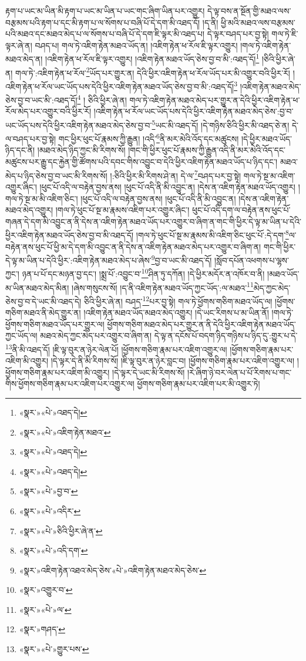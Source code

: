 རྟག་པ་ཡང་མ་ཡིན་མི་རྟག་པ་ཡང་མ་ཡིན་པ་ཡང་གང་ཞིག་ཡིན་པར་འགྱུར། དེ་ལྟ་བས་ན་སྔོན་གྱི་མཐའ་ལས་བརྩམས་པའི་རྟག་པ་དང་མི་རྟག་པ་ལ་སོགས་པ་བཞི་པོ་དེ་དག་མི་འཐད་དོ། །ད་ནི། ཕྱི་མའི་མཐའ་ལས་བརྩམས་པའི་མཐའ་དང་མཐའ་མེད་པ་ལ་སོགས་པ་བཞི་པོ་དེ་དག་ཇི་ལྟར་མི་འཐད་པ། དེ་ལྟར་བཤད་པར་བྱ་སྟེ། གལ་ཏེ་ཇི་ལྟར་ཞེ་ན། བཤད་པ། གལ་ཏེ་འཇིག་རྟེན་མཐའ་ཡོད་ན། །འཇིག་རྟེན་ཕ་རོལ་ཇི་ལྟར་འགྱུར། །གལ་ཏེ་འཇིག་རྟེན་མཐའ་མེད་ན། །འཇིག་རྟེན་ཕ་རོལ་ཇི་ལྟར་འགྱུར། །འཇིག་རྟེན་མཐའ་ཡོད་ཅེས་བྱ་བ་མི་:འཐད་དོ།\footnote{«སྣར་»«པེ་»འཐད་དེ།} །ཅིའི་ཕྱིར་ཞེ་ན། གལ་ཏེ་:འཇིག་རྟེན་ཕ་རོལ་\footnote{«སྣར་»«པེ་»འཇིག་རྟེན་མཐའ་}ཡོད་པར་གྱུར་ན། དེའི་ཕྱིར་འཇིག་རྟེན་ཕ་རོལ་ཡོད་པར་མི་འགྱུར་བའི་ཕྱིར་རོ། །འཇིག་རྟེན་ཕ་རོལ་ཡང་ཡོད་པས་དེའི་ཕྱིར་འཇིག་རྟེན་མཐའ་ཡོད་ཅེས་བྱ་བ་མི་:འཐད་དོ།\footnote{«སྣར་»«པེ་»འཐད་དེ།} །འཇིག་རྟེན་མཐའ་མེད་ཅེས་བྱ་བ་ཡང་མི་:འཐད་དོ།\footnote{«སྣར་»«པེ་»འཐད་དེ།} །
ཅིའི་ཕྱིར་ཞེ་ན། གལ་ཏེ་འཇིག་རྟེན་མཐའ་མེད་པར་གྱུར་ན་དེའི་ཕྱིར་འཇིག་རྟེན་ཕ་རོལ་མེད་པར་འགྱུར་བའི་ཕྱིར་རོ། །འཇིག་རྟེན་ཕ་རོལ་ཡང་ཡོད་པས་དེའི་ཕྱིར་འཇིག་རྟེན་མཐའ་མེད་ཅེས་:བྱ་བ་ཡང་ཡོད་པས་དེའི་ཕྱིར་འཇིག་རྟེན་མཐའ་མེད་ཅེས་བྱ་བ་\footnote{«སྣར་»«པེ་»བྱ་བ་}ཡང་མི་འཐད་དོ། །དེ་གཉིས་ཅིའི་ཕྱིར་མི་འཐད་ཅེ་ན། དེ་ལ་བཤད་པར་བྱ་སྟེ། གང་ཕྱིར་ཕུང་པོ་རྣམས་ཀྱི་རྒྱུན། །འདི་\footnote{«སྣར་»«པེ་»འདིར་}ནི་མར་མེའི་འོད་དང་མཚུངས། །དེ་ཕྱིར་མཐའ་ཡོད་ཉིད་དང་ནི། །མཐའ་མེད་ཉིད་ཀྱང་མི་རིགས་སོ། །གང་གི་ཕྱིར་ཕུང་པོ་རྣམས་ཀྱི་རྒྱུན་འདི་ནི་མར་མེའི་འོད་དང་མཚུངས་པར་རྒྱུ་དང་རྐྱེན་གྱི་ཚོགས་པའི་དབང་གིས་འབྱུང་བ་དེའི་ཕྱིར་འཇིག་རྟེན་མཐའ་ཡོད་པ་ཉིད་དང་། མཐའ་མེད་པ་ཉིད་ཅེས་བྱ་བ་ཡང་མི་རིགས་སོ། །:ཅིའི་ཕྱིར་མི་རིགས་ཤེ་ན། དེ་ལ་\footnote{«སྣར་»«པེ་»ཅིའི་ཕྱིར་ཞེ་ན་}བཤད་པར་བྱ་སྟེ། གལ་ཏེ་སྔ་མ་འཇིག་འགྱུར་ཞིང་། །ཕུང་པོ་འདི་ལ་བརྟེན་བྱས་ནས། །ཕུང་པོ་འདི་ནི་མི་འབྱུང་ན། །དེས་ན་འཇིག་རྟེན་མཐའ་ཡོད་འགྱུར། །གལ་ཏེ་སྔ་མ་མི་འཇིག་ཅིང་། །ཕུང་པོ་འདི་ལ་བརྟེན་བྱས་ནས། །ཕུང་པོ་འདི་ནི་མི་འབྱུང་ན། །དེས་ན་འཇིག་རྟེན་མཐའ་མེད་འགྱུར། །གལ་ཏེ་ཕུང་པོ་སྔ་མ་རྣམས་འཇིག་པར་འགྱུར་ཞིང་། ཕུང་པོ་འདི་དག་ལ་བརྟེན་ནས་ཕུང་པོ་གཞན་དེ་དག་མི་འབྱུང་ན་ནི་དེས་ན་འཇིག་རྟེན་མཐའ་ཡོད་པར་འགྱུར་བ་ཞིག་ན་གང་གི་ཕྱིར་དེ་ལྟ་མ་ཡིན་པ་དེའི་ཕྱིར་འཇིག་རྟེན་མཐའ་ཡོད་ཅེས་བྱ་བ་མི་འཐད་དོ། །གལ་ཏེ་ཕུང་པོ་སྔ་མ་རྣམས་མི་འཇིག་ཅིང་ཕུང་པོ་:དེ་དག་\footnote{«སྣར་»«པེ་»འདི་དག་}ལ་བརྟེན་ནས་ཕུང་པོ་ཕྱི་མ་དེ་དག་མི་འབྱུང་ན་ནི་དེས་ན་འཇིག་རྟེན་མཐའ་མེད་པར་འགྱུར་བ་ཞིག་ན། གང་གི་ཕྱིར་དེ་ལྟ་མ་ཡིན་པ་དེའི་ཕྱིར་:འཇིག་རྟེན་མཐའ་མེད་པ་ཞེས་\footnote{«སྣར་»འཇིག་རྟེན་འཐའ་མེད་ཅེས་«པེ་»འཇིག་རྟེན་མཐའ་མེད་ཅེས་}བྱ་བ་ཡང་མི་འཐད་དོ། །སློབ་དཔོན་འཕགས་པ་ལྷས་ཀྱང་། ཉན་པ་པོ་དང་མཉན་བྱ་དང་། །སྨྲ་པོ་:འབྱུང་བ་\footnote{«སྣར་»འགྱུར་བ་}ཤིན་ཏུ་དཀོན། །དེ་ཕྱིར་མདོར་ན་འཁོར་བ་ནི། །མཐའ་ཡོད་མ་ཡིན་མཐའ་མེད་མིན། །ཞེས་གསུངས་སོ། །ད་ནི་འཇིག་རྟེན་མཐའ་ཡོད་ཀྱང་ཡོད་:ལ་མཐའ་\footnote{«སྣར་»«པེ་»ལ་}མེད་ཀྱང་མེད་ཅེས་བྱ་བ་དེ་ཡང་མི་འཐད་དེ། ཅིའི་ཕྱིར་ཞེ་ན། བཤད་\footnote{«སྣར་»གཤད་}པར་བྱ་སྟེ། གལ་ཏེ་ཕྱོགས་གཅིག་མཐའ་ཡོད་ལ། །ཕྱོགས་གཅིག་མཐའ་ནི་མེད་གྱུར་ན། །འཇིག་རྟེན་མཐའ་ཡོད་མཐའ་མེད་འགྱུར། །དེ་ཡང་རིགས་པ་མ་ཡིན་ནོ། །གལ་ཏེ་ཕྱོགས་གཅིག་མཐའ་ཡོད་པར་གྱུར་ལ། ཕྱོགས་གཅིག་མཐའ་མེད་པར་གྱུར་ན་ནི་དེའི་ཕྱིར་འཇིག་རྟེན་མཐའ་ཡོད་ཀྱང་ཡོད་ལ། མཐའ་མེད་ཀྱང་མེད་པར་འགྱུར་བ་ཞིག་ན། དེ་ལྟ་ན་དངོས་པོ་བདག་ཉིད་གཉིས་པ་ཉིད་དུ་:གྱུར་པ་དེ་\footnote{«སྣར་»«པེ་»གྱུར་པས་}ནི་མི་འཐད་དོ། །ཇི་ལྟ་བུར་ན་ཉེར་ལེན་པོ། །ཕྱོགས་གཅིག་རྣམ་པར་འཇིག་འགྱུར་ལ། །ཕྱོགས་གཅིག་རྣམ་པར་འཇིག་མི་འགྱུར། །དེ་ལྟར་དེ་ནི་མི་རིགས་སོ། །ཇི་ལྟ་བུར་ན་ཉེར་བླང་བ། །ཕྱོགས་གཅིག་རྣམ་པར་འཇིག་འགྱུར་ལ། །ཕྱོགས་གཅིག་རྣམ་པར་འཇིག་མི་འགྱུར། །དེ་ལྟར་དེ་ཡང་མི་རིགས་སོ། །རེ་ཞིག་ཉེ་བར་ལེན་པ་པོ་རིགས་པ་གང་གིས་ཕྱོགས་གཅིག་རྣམ་པར་འཇིག་པར་འགྱུར་ལ། ཕྱོགས་གཅིག་རྣམ་པར་འཇིག་པར་མི་འགྱུར་ཏེ། 
